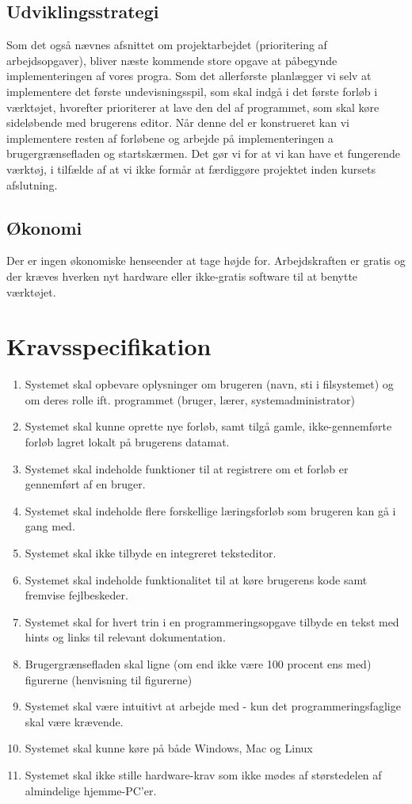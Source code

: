 \documentclass[10pt,a4paper,danish]{article}
\begin{document}
\subsection{Udviklingsstrategi}
Som det også nævnes afsnittet om projektarbejdet (prioritering af arbejdsopgaver), bliver næste kommende store opgave at påbegynde implementeringen af vores progra. Som det allerførste planlægger vi selv at implementere det første undevisningsspil, som skal indgå i det første forløb i værktøjet, hvorefter prioriterer at lave den del af programmet, som skal køre sideløbende med brugerens editor. Når denne del er konstrueret kan vi implementere resten af forløbene og arbejde på implementeringen a brugergrænsefladen og startskærmen. Det gør vi for at vi kan have et fungerende værktøj, i tilfælde af at vi ikke formår at færdiggøre projektet inden kursets afslutning.

\subsection{Økonomi}
Der er ingen økonomiske henseender at tage højde for. Arbejdskraften er gratis og der kræves hverken nyt hardware eller ikke-gratis software til at benytte værktøjet.

\section{Kravsspecifikation}
\begin{enumerate}
\item Systemet skal opbevare oplysninger om brugeren (navn, sti i filsystemet) og om deres rolle ift. programmet (bruger, lærer, systemadministrator)
\item Systemet skal kunne oprette nye forløb, samt tilgå gamle, ikke-gennemførte forløb lagret lokalt på brugerens datamat. 
\item Systemet skal indeholde funktioner til at registrere om et forløb er gennemført af en bruger. 
\item Systemet skal indeholde flere forskellige læringsforløb som brugeren kan gå i gang med.  
\item Systemet skal ikke tilbyde en integreret teksteditor.
\item Systemet skal indeholde funktionalitet til at køre brugerens kode samt fremvise fejlbeskeder.
\item Systemet skal for hvert trin i en programmeringsopgave tilbyde en tekst med hints og links til relevant dokumentation.
\item Brugergrænsefladen skal ligne (om end ikke være 100 procent ens med) figurerne (henvisning til figurerne)
\item Systemet skal være intuitivt at arbejde med - kun det programmeringsfaglige skal være krævende. 
\item Systemet skal kunne køre på både Windows, Mac og Linux
\item Systemet skal ikke stille hardware-krav som ikke mødes af størstedelen af almindelige hjemme-PC'er.
\end{enumerate} 
\end{document}
